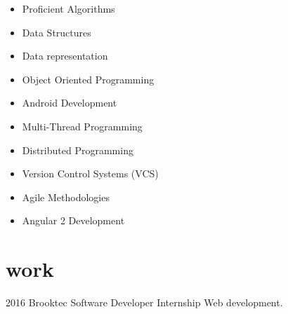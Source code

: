 \documentclass[]{friggeri-cv} %
\begin{document}
        \noindent\begin{minipage}[t]{0.5\linewidth}
            \begin{itemize}
            	\item{Proficient Algorithms}
        	\item{Data Structures}
            	\item{Data representation}
            	\item{Object Oriented Programming}
            	\item{Android Development}

            \end{itemize}
            \end{minipage}%
            \begin{minipage}[t]{0.5\linewidth}
            \begin{itemize}
            	\item{Multi-Thread Programming}
            	\item{Distributed Programming}
           	\item{Version Control Systems (VCS)}
            \item{Agile Methodologies}
            \item{Angular 2 Development}
            \end{itemize}
        \end{minipage}\par\bigskip




    \section{work}

        \begin{entrylist}

            \entry
            {2016}
            {Brooktec}
            {Software Developer Internship}
            {Web development.}

        \end{entrylist}

\end{document}
